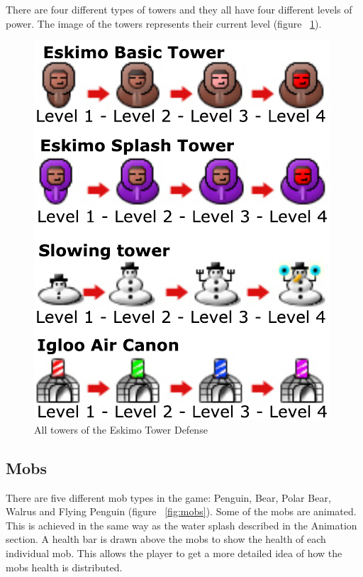 There are four different types of towers and they all have four different levels of power. The image of the towers represents their current level (figure ~\ref{fig:allTowers}).

\begin{figure}[here]

\begin{center}

\includegraphics[scale=0.6]{pics/chapters/chapter4/alltowers}

\end{center}

\caption{All towers of the Eskimo Tower Defense}

\label{fig:allTowers}

\end{figure}

\subsection{Mobs}

There are five different mob types in the game: Penguin, Bear, Polar Bear, Walrus and Flying Penguin (figure ~\ref{fig:mobs}). Some of the mobs are animated. This is achieved in the same way as the water splash described in the Animation section. A health bar is drawn above the mobs to show the health of each individual mob. This allows the player to get a more detailed idea of how the mobs health is distributed. 

